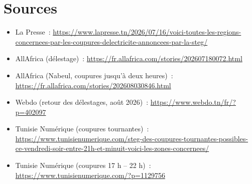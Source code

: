 \documentclass[10pt,a4paper]{article}
\begin{document}
\section*{Sources}
{\small
\begin{itemize}
  \item La Presse~: \url{https://www.lapresse.tn/2026/07/16/voici-toutes-les-regions-concernees-par-les-coupures-delectricite-annoncees-par-la-steg/}
  \item AllAfrica (délestage)~: \url{https://fr.allafrica.com/stories/202607180072.html}
  \item AllAfrica (Nabeul, coupures jusqu'à deux heures)~: \url{https://fr.allafrica.com/stories/202608030846.html}
  \item Webdo (retour des délestages, août 2026)~: \url{https://www.webdo.tn/fr/?p=402097}
  \item Tunisie Numérique (coupures tournantes)~: \url{https://www.tunisienumerique.com/steg-des-coupures-tournantes-possibles-ce-vendredi-soir-entre-21h-et-minuit-voici-les-zones-concernees/}
  \item Tunisie Numérique (coupures 17 h -- 22 h)~: \url{https://www.tunisienumerique.com/?p=1129756}
\end{itemize}
}
\end{document}

